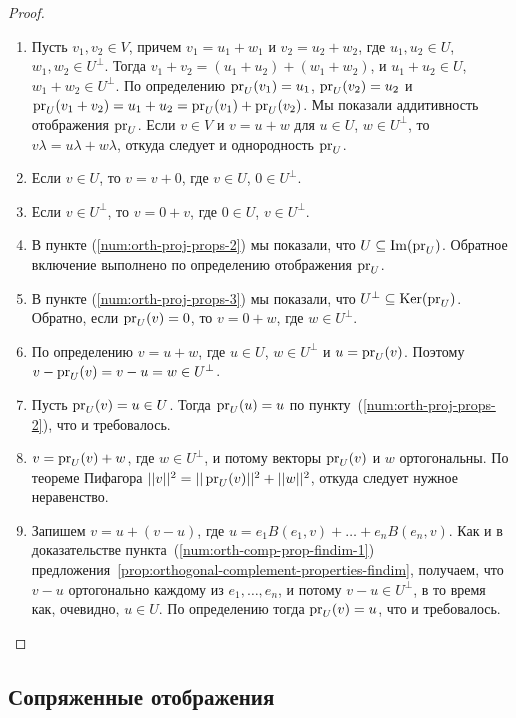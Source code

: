 \begin{proof}
\begin{enumerate}
\item Пусть $v_1,v_2\in V$, причем $v_1 = u_1 + w_1$
и $v_2 = u_2 + w_2$, где $u_1,u_2\in U$, $w_1,w_2\in U^\perp$.
Тогда $v_1+v_2 = (u_1+u_2) + (w_1+w_2)$, и $u_1+u_2\in U$,
$w_1+w_2\in U^\perp$. По определению
$\operatorname{pr}_U(v_1) = u_1$, $\operatorname{pr}_U(v_2) = u_2$ и
$\operatorname{pr}_U(v_1+v_2) = u_1 + u_2 = \operatorname{pr}_U(v_1) + \operatorname{pr}_U(v_2)$.
Мы показали аддитивность отображения $\operatorname{pr}_U$. Если $v\in V$
и $v = u + w$ для $u\in U$, $w\in U^\perp$, то
$v\lambda = u\lambda + w\lambda$, откуда следует и однородность
$\operatorname{pr}_U$.
\item Если $v\in U$, то $v = v + 0$, где $v\in U$, $0\in U^\perp$.
\item Если $v\in U^\perp$, то $v = 0 + v$, где $0\in U$, $v\in U^\perp$.
\item В пункте (\ref{num:orth-proj-props-2}) мы показали,
что $U\subseteq\operatorname{Im}(\operatorname{pr}_U)$. Обратное включение выполнено
по определению отображения $\operatorname{pr}_U$.
\item В пункте (\ref{num:orth-proj-props-3}) мы показали,
что $U^\perp\subseteq\operatorname{Ker}(\operatorname{pr}_U)$. Обратно, если
$\operatorname{pr}_U(v) = 0$, то $v = 0 + w$, где $w\in U^\perp$.
\item По определению $v = u + w$, где $u\in U$, $w\in U^\perp$
и $u = \operatorname{pr}_U(v)$. Поэтому $v - \operatorname{pr}_U(v) = v - u = w\in U^\perp$.
\item Пусть $\operatorname{pr}_U(v) = u\in U$. Тогда $\operatorname{pr}_U(u) = u$
по пункту~(\ref{num:orth-proj-props-2}), что и требовалось.
\item $v = \operatorname{pr}_U(v) + w$, где $w\in U^\perp$, и потому векторы
$\operatorname{pr}_U(v)$ и $w$ ортогональны. По теореме Пифагора
$||v||^2 = ||\operatorname{pr}_U(v)||^2 + ||w||^2$, откуда следует нужное неравенство.
\item Запишем $v = u + (v-u)$,
где $u = e_1B(e_1,v) + \dots + e_n B(e_n,v)$. Как и в доказательстве
пункта~(\ref{num:orth-comp-prop-findim-1})
предложения~\ref{prop:orthogonal-complement-properties-findim},
получаем, что $v-u$ ортогонально каждому из $e_1,\dots,e_n$,
и потому $v-u\in U^\perp$, в то время как, очевидно,
$u\in U$. По определению тогда $\operatorname{pr}_U(v) = u$, что и требовалось.
\end{enumerate}
\end{proof}

\subsection{Сопряженные отображения}

